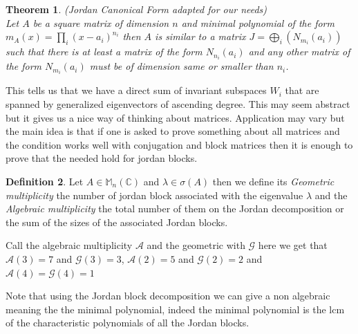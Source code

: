 \documentclass[12pt]{article}
\newtheorem{theorem}{Theorem}[section]
\theoremstyle{definition}
\newtheorem{definition}[theorem]{Definition}
\theoremstyle{remark}
\theoremstyle{plain}
\begin{document}
\begin{theorem}\textup{(Jordan Canonical Form adapted for our needs)}\\
	Let $A$ be a square matrix of dimension $n$ and minimal polynomial of the form $m_A(x)=\prod\limits_i(x-a_i)^{n_i}$ then $A$ is similar to a matrix $J=\bigoplus\limits_i(N_{m_i}(a_i))$ such that there is at least a matrix of the form $N_{n_i}(a_i)$ and any other matrix of the form $ N_{m_i}(a_i) $ must be of dimension same or smaller than $ n_i $.
\end{theorem}
This tells us that we have a direct sum of invariant subspaces $W_i$ that are spanned by generalized eigenvectors of ascending degree.
This may seem abstract but it gives us a nice way of thinking about matrices. Application may vary but the main idea is that if one is asked to prove something about all matrices and the condition works well with conjugation and block matrices then it is enough to prove that the needed hold for jordan blocks.

\begin{definition}
    Let $A\in \mathbb{M}_n(\mathbb{C})$ and $\lambda\in\sigma(A)$ then we define its \textit{Geometric multiplicity} the number of jordan block associated with the eigenvalue $\lambda$ and the \textit{Algebraic multiplicity} the total number of them on the Jordan decomposition or the sum of the sizes of the associated Jordan blocks.
\end{definition}
\begin{minipage}{0.58\textwidth}
\end{minipage}
\hfill
\begin{minipage}{0.38\textwidth}
Call the algebraic multiplicity $\mathscr{A}$ and the geometric with $\mathscr{G}$ here we get that $\mathscr{A}(3)=7$ and $\mathscr{G}(3)=3$, $\mathscr{A}(2)=5$ and $\mathscr{G}(2)=2$ and $\mathscr{A}(4)=\mathscr{G}(4)=1$
\end{minipage}
Note that using the Jordan block decomposition we can give a non algebraic meaning the the minimal polynomial, indeed the minimal polynomial is the $\mathrm{lcm}$ of the characteristic polynomials of all the Jordan blocks.
\newpage
\end{document}
